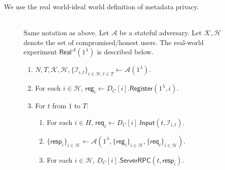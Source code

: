 \documentclass[sigconf, nonacm, balance=false, natbib=false, screen]{acmart}
\newcommand{\reg}{\mathsf{reg}}
\newcommand{\req}{\mathsf{req}}
\newcommand{\resp}{\mathsf{resp}}
\newcommand{\cK}{\mathcal{K}}
\newcommand{\cA}{\mathcal{A}}
\newcommand{\cI}{\mathcal{I}}
\newcommand{\cH}{\mathcal{H}}
\begin{document}
We use the real world-ideal world definition of metadata privacy.
\begin{figure}[h!]
\begin{framed}
\begin{definition} \hfill\\
Same notation as above. Let $\cA$ be a stateful adversary. Let $\cK, \cH$ denote the set of compromised/honest users. The real-world experiment $\mathsf{Real}^{\cA}(1^{\lambda})$ is described below.
\begin{enumerate}
\item $N, T, \cK, \cH, \{\cI_{i, t}\}_{i \in \cH, t \in T} \leftarrow \cA(1^{\lambda})$.
\item For each $i \in \cH$, $\reg_i \leftarrow D_C[i].\mathsf{Register}(1^{\lambda}, i)$. 
\item For $t$ from $1$ to $T$:
    \begin{enumerate}
    \item For each $i \in H$, $\req_i \leftarrow D_C[i].\mathsf{Input}(t, \cI_{i, t})$.
    
    \item $\{\resp_i\}_{i \in \cH} \leftarrow \cA(1^{\lambda}, \{\reg_i\}_{i \in \cH}, \{\req_i\}_{i \in \cH})$.
    
    \item For each $i \in \cH$, $D_C[i].\mathsf{ServerRPC}(t, \resp_i)$.
    \end{enumerate}
\end{enumerate}
\end{definition}
\end{framed}
\end{figure}
\end{document}
